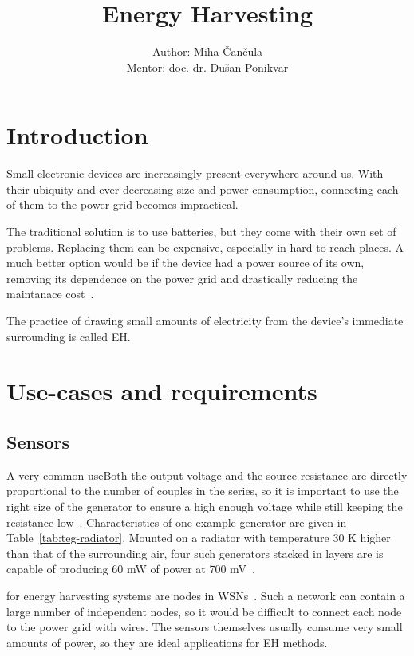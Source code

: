 \documentclass[a4paper,10pt]{article}
\title{Energy Harvesting}
\author{Author: Miha \v Can\v cula \\ Mentor: doc. dr. Du\v san Ponikvar}
\begin{document}
\maketitle

\tableofcontents

\section{Introduction}

Small electronic devices are increasingly present everywhere around us. With their ubiquity and ever decreasing size and power consumption, connecting each of them to the power grid becomes impractical. 

The traditional solution is to use batteries, but they come with their own set of problems. Replacing them can be expensive, especially in hard-to-reach places. A much better option would be if the device had a power source of its own, removing its dependence on the power grid and drastically reducing the maintanace cost~\cite{Burgoine11}. 

The practice of drawing small amounts of electricity from the device's immediate surrounding is called \ac{EH}. 

\section{Use-cases and requirements}

\subsection{Sensors}

A very common useBoth the output voltage and the source resistance are directly proportional to the number of couples in the series, so it is important to use the right size of the generator to ensure a high enough voltage while still keeping the resistance low~\cite{Salerno10}. Characteristics of one example generator are given in Table~\ref{tab:teg-radiator}. Mounted on a radiator with temperature 30 K higher than that of the surrounding air, four such generators stacked in layers are is capable of producing 60 mW of power at 700 mV~\cite{teg-wsn-ieee}. 

 for energy harvesting systems are nodes in \acp{WSN}~\cite{teg-wsn-ieee,cap-wsn-ieee}. Such a network can contain a large number of independent nodes, so it would be difficult to connect each node to the power grid with wires. The sensors themselves usually consume very small amounts of power, so they are ideal applications for \acl{EH} methods. 
\end{document}
